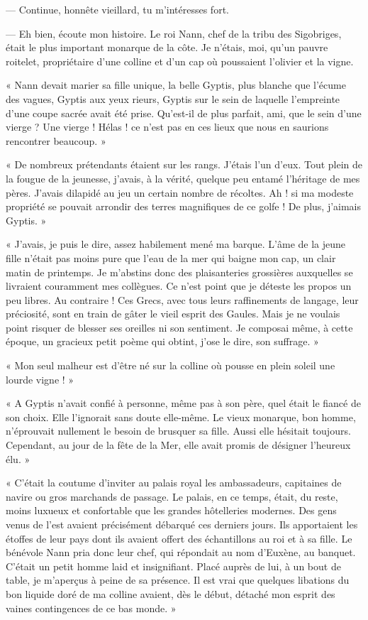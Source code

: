 \documentclass[a4paper, 11pt, oneside, polutonikogreek, french]{article}
\begin{document}
--- Continue, honnête vieillard, tu m'intéresses fort.

--- Eh bien, écoute mon histoire. Le roi Nann, chef de la tribu des Sigobriges, était le plus important monarque de la côte. Je n'étais, moi, qu'un pauvre roitelet, propriétaire d'une colline et d'un cap où poussaient l'olivier et la vigne.

« Nann devait marier sa fille unique, la belle Gyptis, plus blanche que l'écume des vagues, Gyptis aux yeux rieurs, Gyptis sur le sein de laquelle l'empreinte d'une coupe sacrée avait été prise. Qu'est-il de plus parfait, ami, que le sein d'une vierge ? Une vierge ! Hélas ! ce n'est pas en ces lieux que nous en saurions rencontrer beaucoup. »

« De nombreux prétendants étaient sur les rangs. J'étais l'un d'eux. Tout plein de la fougue de la jeunesse, j'avais, à la vérité, quelque peu entamé l'héritage de mes pères. J'avais dilapidé au jeu un certain nombre de récoltes. Ah ! si ma modeste propriété se pouvait arrondir des terres magnifiques de ce golfe ! De plus, j'aimais Gyptis. »

« J'avais, je puis le dire, assez habilement mené ma barque. L'âme de la jeune fille n'était pas moins pure que l'eau de la mer qui baigne mon cap, un clair matin de printemps. Je m'abstins donc des plaisanteries grossières auxquelles se livraient couramment mes collègues. Ce n'est point que je déteste les propos un peu libres. Au contraire ! Ces Grecs, avec tous leurs raffinements de langage, leur préciosité, sont en train de gâter le vieil esprit des Gaules. Mais je ne voulais point risquer de blesser ses oreilles ni son sentiment. Je composai même, à cette époque, un gracieux petit poème qui obtint, j'ose le dire, son suffrage. »

« Mon seul malheur est d'être né sur la colline où pousse en plein soleil une lourde vigne ! »

« A Gyptis n'avait confié à personne, même pas à son père, quel était le fiancé de son choix. Elle l'ignorait sans doute elle-même. Le vieux monarque, bon homme, n'éprouvait nullement le besoin de brusquer sa fille. Aussi elle hésitait toujours. Cependant, au jour de la fête de la Mer, elle avait promis de désigner l'heureux élu. »

« C'était la coutume d'inviter au palais royal les ambassadeurs, capitaines de navire ou gros marchands de passage. Le palais, en ce temps, était, du reste, moins luxueux et confortable que les grandes hôtelleries modernes. Des gens venus de l'est avaient précisément débarqué ces derniers jours. Ils apportaient les étoffes de leur pays dont ils avaient offert des échantillons au roi et à sa fille. Le bénévole Nann pria donc leur chef, qui répondait au nom d'Euxène, au banquet. C'était un petit homme laid et insignifiant. Placé auprès de lui, à un bout de table, je m'aperçus à peine de sa présence. Il est vrai que quelques libations du bon liquide doré de ma colline avaient, dès le début, détaché mon esprit des vaines contingences de ce bas monde. »
\end{document}
